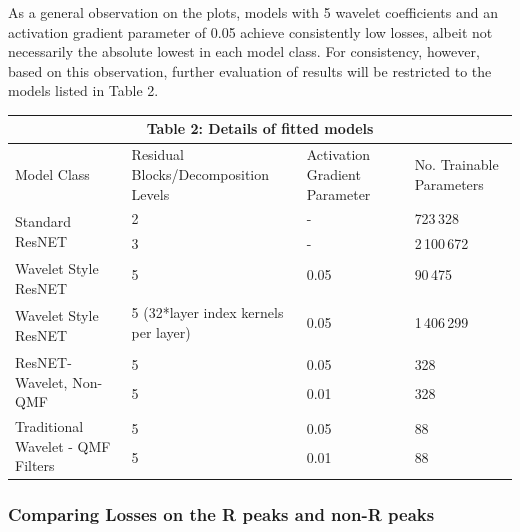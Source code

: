 \documentclass[9pt,conference]{IEEEtran}
\begin{document}
As a general observation on the plots, models with 5 wavelet coefficients and an activation gradient parameter of 0.05 achieve consistently low losses, albeit not necessarily the absolute lowest in each model class. For consistency, however, based on this observation, further evaluation of results will be restricted to the models listed in Table 2.

\begin{center}
    \begin{tabular}{ |p{3cm}||p{3cm}|p{3cm}|p{3cm}|  }
     \hline
     \multicolumn{4}{|c|}{Table 2: Details of fitted models} \\
     \hline
     Model Class& Residual Blocks/Decomposition Levels & Activation Gradient Parameter & No. Trainable Parameters \\
     \hline
        \multirow{2}{4em}{Standard ResNET}  
                                        &   2  & -& 723\,328   \\
                                        & 3 & -& 2\,100\,672\\
      \hline
      \multirow{2}{6em}{Wavelet Style ResNET}  
                                        & 5 & 0.05 & 90\,475 \\
                                        & & & \\
        \hline  
    \multirow{2}{6em}{Wavelet Style ResNET}  
                                        & 5 (32*layer index kernels per layer) & 0.05 & 1\,406\,299 \\
                                         & & & \\
        \hline
     \multirow{3}{7em}{ResNET-Wavelet, Non-QMF}  
                                    & 5 & 0.05 & 328 \\
                                     & 5 & 0.01 & 328 \\ & & & \\
    \hline

    \multirow{3}{6em}{Traditional Wavelet - QMF Filters}  
                                    & 5 & 0.05 & 88 \\
                                     & 5 & 0.01 & 88 \\
                                     & & & \\
    \hline
    \end{tabular}
\end{center}



\subsubsection{Comparing Losses on the R peaks and non-R peaks}
\end{document}
